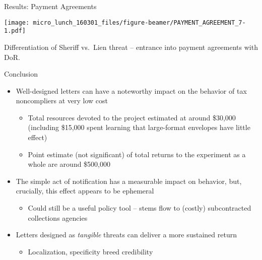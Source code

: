 \documentclass[ignorenonframetext,]{beamer}
\providecommand{\tightlist}{%
  \setlength{\itemsep}{0pt}\setlength{\parskip}{0pt}}
\begin{document}
\begin{frame}{Results: Payment Agreements}

\texttt{[image: micro\_lunch\_160301\_files/figure-beamer/PAYMENT\_AGREEMENT\_7-1.pdf]}

Differentiation of Sheriff vs.~Lien threat -- entrance into payment
agreements with DoR.

\end{frame}

\begin{frame}{Conclusion}

\begin{itemize}
\item
  Well-designed letters can have a noteworthy impact on the behavior of
  tax noncompliers at very low cost

  \begin{itemize}
  \item
    Total resources devoted to the project estimated at around \$30,000
    (including \$15,000 spent learning that large-format envelopes have
    little effect)
  \item
    Point estimate (not significant) of total returns to the experiment
    as a whole are around \$500,000
  \end{itemize}
\item
  The simple act of notification has a measurable impact on behavior,
  but, crucially, this effect appears to be ephemeral

  \begin{itemize}
  \tightlist
  \item
    Could still be a useful policy tool -- stems flow to (costly)
    subcontracted collections agencies
  \end{itemize}
\item
  Letters designed as \emph{tangible} threats can deliver a more
  sustained return

  \begin{itemize}
  \tightlist
  \item
    Localization, specificity breed credibility
  \end{itemize}
\end{itemize}

\end{frame}
\end{document}
